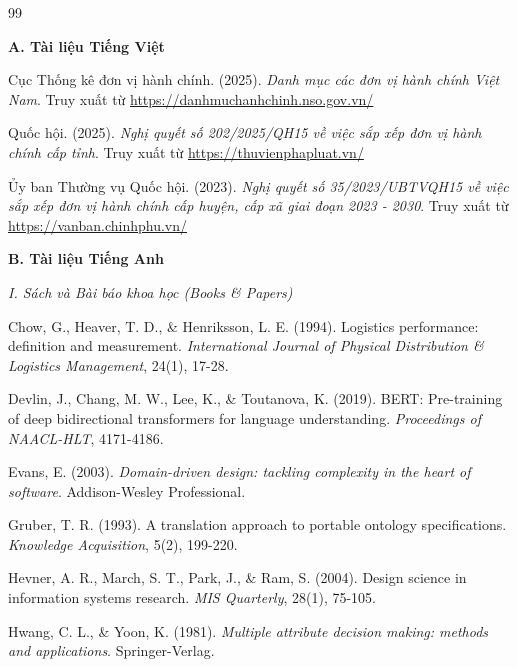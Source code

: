 \begin{thebibliography}{99}

    \item[] \textbf{A. Tài liệu Tiếng Việt}

    Cục Thống kê đơn vị hành chính. (2025). \textit{Danh mục các đơn vị hành chính Việt Nam}. Truy xuất từ \url{https://danhmuchanhchinh.nso.gov.vn/}

    Quốc hội. (2025). \textit{Nghị quyết số 202/2025/QH15 về việc sắp xếp đơn vị hành chính cấp tỉnh}. Truy xuất từ \url{https://thuvienphapluat.vn/}

    Ủy ban Thường vụ Quốc hội. (2023). \textit{Nghị quyết số 35/2023/UBTVQH15 về việc sắp xếp đơn vị hành chính cấp huyện, cấp xã giai đoạn 2023 - 2030}. Truy xuất từ \url{https://vanban.chinhphu.vn/}

    \item[] \textbf{B. Tài liệu Tiếng Anh}
    \item[] \textit{I. Sách và Bài báo khoa học (Books \& Papers)}

    Chow, G., Heaver, T. D., \& Henriksson, L. E. (1994). Logistics performance: definition and measurement. \textit{International Journal of Physical Distribution \& Logistics Management}, 24(1), 17-28.

    Devlin, J., Chang, M. W., Lee, K., \& Toutanova, K. (2019). BERT: Pre-training of deep bidirectional transformers for language understanding. \textit{Proceedings of NAACL-HLT}, 4171-4186.

    Evans, E. (2003). \textit{Domain-driven design: tackling complexity in the heart of software}. Addison-Wesley Professional.

    Gruber, T. R. (1993). A translation approach to portable ontology specifications. \textit{Knowledge Acquisition}, 5(2), 199-220.

    Hevner, A. R., March, S. T., Park, J., \& Ram, S. (2004). Design science in information systems research. \textit{MIS Quarterly}, 28(1), 75-105.

    Hwang, C. L., \& Yoon, K. (1981). \textit{Multiple attribute decision making: methods and applications}. Springer-Verlag.


\end{thebibliography}
